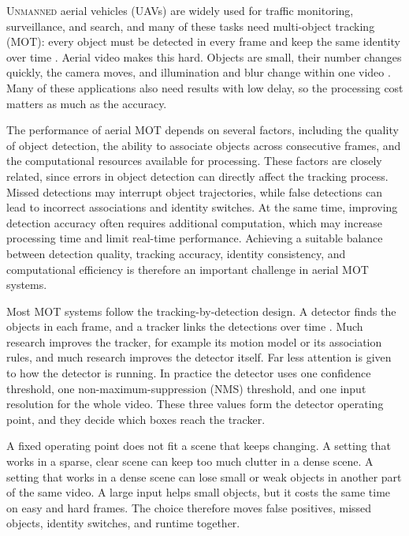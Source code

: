 \documentclass[journal]{new-aiaa}
\begin{document}
\lettrine{U}{nmanned} aerial vehicles (UAVs) are widely used for traffic monitoring,
surveillance, and search, and many of these tasks need multi-object tracking
(MOT): every object must be detected in every frame and keep the same
identity over time \cite{wu2022uavsurvey,zhu2022visdrone}. Aerial video makes
this hard. Objects are small, their number changes quickly, the camera moves,
and illumination and blur change within one video
\cite{zhu2022visdrone,du2018uavdt,cheng2023smallobject}. Many of these
applications also need results with low delay, so the processing cost matters
as much as the accuracy.

The performance of aerial MOT depends on several factors, including the quality of object detection, the ability to associate objects across consecutive frames, and the computational resources available for processing. These factors are closely related, since errors in object detection can directly affect the tracking process. Missed detections may interrupt object trajectories, while false detections can lead to incorrect associations and identity switches. At the same time, improving detection accuracy often requires additional computation, which may increase processing time and limit real-time performance. Achieving a suitable balance between detection quality, tracking accuracy, identity consistency, and computational efficiency is therefore an important challenge in aerial MOT systems.

Most MOT systems follow the tracking-by-detection design. A detector finds the
objects in each frame, and a tracker links the detections over time
\cite{bewley2016sort,zhang2022bytetrack}. Much research improves the tracker,
for example its motion model or its association rules, and much research
improves the detector itself. Far less attention is given to how the detector
is running. In practice the detector uses one confidence threshold, one
non-maximum-suppression (NMS) threshold, and one input resolution for the
whole video. These three values form the detector operating point, and they
decide which boxes reach the tracker.

A fixed operating point does not fit a scene that keeps changing. A setting
that works in a sparse, clear scene can keep too much clutter in a dense
scene. A setting that works in a dense scene can lose small or weak objects in
another part of the same video. A large input helps small objects, but it
costs the same time on easy and hard frames. The choice therefore moves false
positives, missed objects, identity switches, and runtime together.
\end{document}
